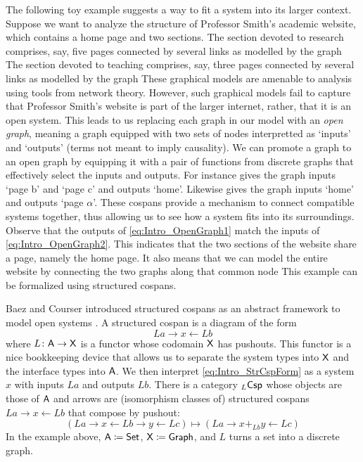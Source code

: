 \documentclass{amsart}
\begin{document}
The following toy example suggests a way to fit a
system into its larger context. Suppose we want to
analyze the structure of Professor Smith's
academic website, which contains a home page and
two sections. The section devoted to research
comprises, say, five pages connected by several
links as modelled by the graph
 The section
devoted to teaching comprises, say, three pages
connected by several links as modelled by the
graph  These
graphical models are amenable to analysis using
tools from network theory. However, such graphical
models fail to capture that Professor Smith's
website is part of the larger internet, rather,
that it is an open system. This leads to us
replacing each graph in our model with an
\emph{open graph}, meaning a graph equipped with
two sets of nodes interpretted as `inputs' and
`outputs' (terms not meant to imply causality). We
can promote a graph to an open graph by equipping
it with a pair of functions from discrete graphs
that effectively select the inputs and
outputs. For instance
 gives the graph
inputs `page b' and `page c' and outputs
`home'. Likewise
 gives the graph
inputs `home' and outputs `page $ \alpha $'.
These cospans provide a mechanism to connect
compatible systems together, thus allowing us to
see how a system fits into its
surroundings. Observe that the outputs of
\eqref{eq:Intro_OpenGraph1} match the inputs of
\eqref{eq:Intro_OpenGraph2}. This indicates that
the two sections of the website share a page,
namely the home page.  It also means that we can
model the entire website by connecting the two graphs
along that common node
 This example
can be formalized using structured cospans.

Baez and Courser introduced structured cospans as
an abstract framework to model open systems
\cite{bc_strCsp}. A structured cospan is a diagram
of the form
\begin{equation}\label{eq:Intro_StrCspForm}
  La \to x \gets Lb
\end{equation}
where $ L \colon \mathsf{A} \to \mathsf{X} $ is a functor whose
codomain $ \mathsf{X} $ has pushouts. This functor is a
nice bookkeeping device that allows us to separate
the system types into $ \mathsf{X} $ and the interface
types into $ \mathsf{A} $.  We then interpret
\eqref{eq:Intro_StrCspForm} as a system $ x $ with
inputs $ La $ and outputs $ Lb $. There is a
category $ _L\mathsf{Csp} $ whose objects are those of
$ \mathsf{A} $ and arrows are (isomorphism classes of) structured cospans
$ La \to x \gets Lb $ that compose by pushout:
$$(La \to x \gets Lb \to y \gets Lc) \mapsto (La \to x +_{Lb}y
\gets Lc)$$ In the example above,
$ \mathsf{A} \coloneqq \mathsf{Set} $, $ \mathsf{X} \coloneqq \mathsf{Graph} $, and
$ L $ turns a set into a discrete graph.
\end{document}

